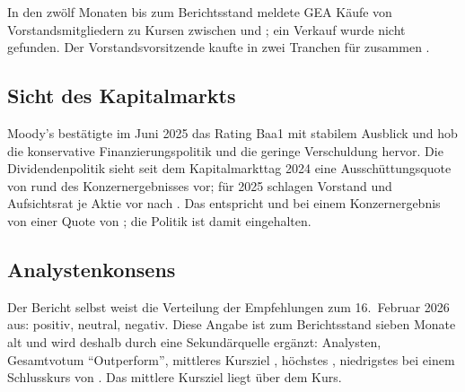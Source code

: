In den zw\"olf Monaten bis zum Berichtsstand meldete GEA \DdKaeufe{} K\"aufe von
\DdPersonen{} Vorstandsmitgliedern zu Kursen zwischen  und
; ein Verkauf wurde nicht gefunden. Der Vorstandsvorsitzende kaufte in
zwei Tranchen f\"ur zusammen .


\subsection{Sicht des Kapitalmarkts}

Moody's best\"atigte im Juni 2025 das Rating Baa1 mit stabilem Ausblick und hob die
konservative Finanzierungspolitik und die geringe Verschuldung hervor. Die
Dividendenpolitik sieht seit dem Kapitalmarkttag 2024 eine Aussch\"uttungsquote von rund
\Pz{\AusschuettungsZiel} des Konzernergebnisses vor; f\"ur 2025 schlagen Vorstand und
Aufsichtsrat  je Aktie vor nach .
Das entspricht  und bei einem Konzernergebnis von
 einer Quote von \AusschuettungsQuote{}; die Politik ist damit
eingehalten.

\subsection{Analystenkonsens}

Der Bericht selbst weist die Verteilung der Empfehlungen zum 16.~Februar 2026 aus:
\Pz{\AnalystPositiv} positiv, \Pz{\AnalystNeutral} neutral, \Pz{\AnalystNegativ}
negativ. Diese Angabe ist zum Berichtsstand sieben Monate alt und wird deshalb
durch eine Sekund\"arquelle erg\"anzt: \KonsensAnalysten{} Analysten, Gesamtvotum
\enquote{Outperform}, mittleres Kursziel , h\"ochstes
, niedrigstes  bei einem Schlusskurs von
. Das mittlere Kursziel liegt \Pz{\KonsensAufschlag} \"uber
dem Kurs.

